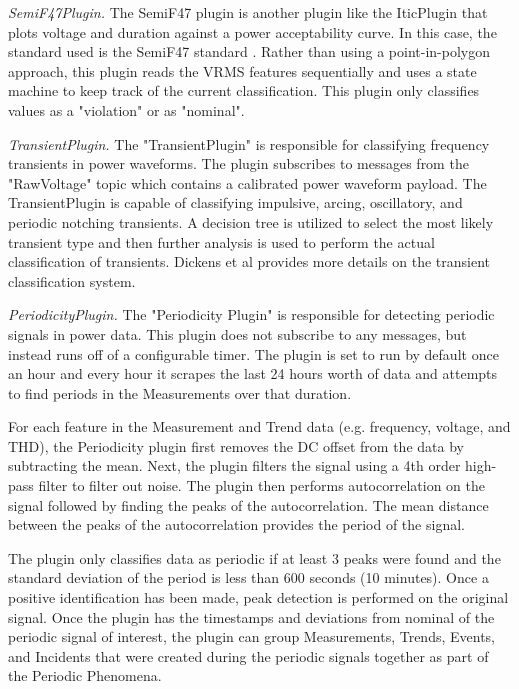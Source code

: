 {\em SemiF47Plugin.} The SemiF47 plugin is another plugin like the IticPlugin that plots voltage and duration against a power acceptability curve. In this case, the standard used is the SemiF47 standard \cite{djokic_sensitivity_2005}. Rather than using a point-in-polygon approach, this plugin reads the VRMS features sequentially and uses a state machine to keep track of the current classification. This plugin only classifies values as a "violation" or as "nominal".

{\em TransientPlugin.} The "TransientPlugin" is responsible for classifying frequency transients in power waveforms. The plugin subscribes to messages from the "RawVoltage" topic which contains a calibrated power waveform payload. The TransientPlugin is capable of classifying impulsive, arcing, oscillatory, and periodic notching transients. A decision tree is utilized to select the most likely transient type and then further analysis is used to perform the actual classification of transients. Dickens et al \cite{dickens_transient_2019} provides more details on the transient classification system.

{\em PeriodicityPlugin.} The "Periodicity Plugin" is responsible for detecting periodic signals in power data. This plugin does not subscribe to any messages, but instead runs off of a configurable timer. The plugin is set to run by default once an hour and every hour it scrapes the last 24 hours worth of data and attempts to find periods in the Measurements over that duration.

For each feature in the Measurement and Trend data (e.g. frequency, voltage, and THD), the Periodicity plugin first removes the DC offset from the data by subtracting the mean. Next, the plugin filters the signal using a 4th order high-pass filter to filter out noise. The plugin then performs autocorrelation on the signal followed by finding the peaks of the autocorrelation. The mean distance between the peaks of the autocorrelation provides the period of the signal.

The plugin only classifies data as periodic if at least 3 peaks were found and the standard deviation of the period is less than 600 seconds (10 minutes). Once a positive identification has been made, peak detection is performed on the original signal. Once the plugin has the timestamps and deviations from nominal of the periodic signal of interest, the plugin can group Measurements, Trends, Events, and Incidents that were created during the periodic signals together as part of the Periodic Phenomena.



